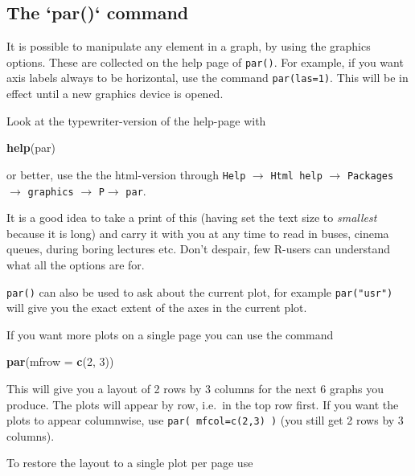 \documentclass[
]{book}
\newenvironment{Shaded}{\begin{snugshade}}{\end{snugshade}}
\newcommand{\AttributeTok}[1]{\textcolor[rgb]{0.13,0.29,0.53}{#1}}
\newcommand{\DecValTok}[1]{\textcolor[rgb]{0.00,0.00,0.81}{#1}}
\newcommand{\FunctionTok}[1]{\textcolor[rgb]{0.13,0.29,0.53}{\textbf{#1}}}
\newcommand{\NormalTok}[1]{#1}
\begin{document}
\subsection{The `par()` command}

It is possible to manipulate any element in a graph, by using the
graphics options. These are collected on the help page of
\texttt{par()}. For example, if you want axis labels always to be
horizontal, use the command \texttt{par(las=1)}. This will be in
effect until a new graphics device is opened.

Look at the typewriter-version of the help-page with

\begin{Shaded}
\begin{Highlighting}[]
\FunctionTok{help}\NormalTok{(par)}
\end{Highlighting}
\end{Shaded}

or better, use the the html-version through
\texttt{Help} \(\rightarrow\) \texttt{Html\ help} \(\rightarrow\)
\texttt{Packages} \(\rightarrow\) \texttt{graphics} \(\rightarrow\)
\texttt{P}\(\rightarrow\) \texttt{par}.

It is a good idea to take a print of this (having set the text
size to \emph{smallest} because it is long) and carry it with you at any
time to read in buses, cinema queues, during boring lectures etc.
Don't despair, few R-users can understand what all the options are
for.

\texttt{par()} can also be used to ask about the current plot, for
example \texttt{par("usr")} will give you the exact extent of the axes
in the current plot.

If you want more plots on a single page you can use the command

\begin{Shaded}
\begin{Highlighting}[]
\FunctionTok{par}\NormalTok{(}\AttributeTok{mfrow =} \FunctionTok{c}\NormalTok{(}\DecValTok{2}\NormalTok{, }\DecValTok{3}\NormalTok{))}
\end{Highlighting}
\end{Shaded}

This will give you a layout of 2 rows by 3 columns for the next 6
graphs you produce. The plots will appear by row, i.e.~in the top
row first. If you want the plots to appear columnwise, use
\texttt{par(\ mfcol=c(2,3)\ )} (you still get 2 rows by 3 columns).

To restore the layout to a single plot per page use
\end{document}

